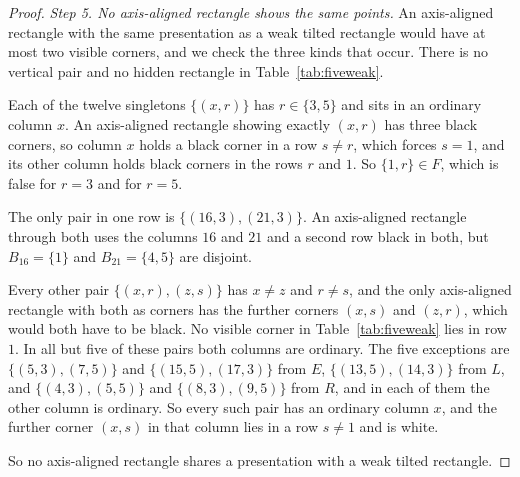\begin{proof}
\emph{Step 5. No axis-aligned rectangle shows the same points.} An axis-aligned rectangle with
the same presentation as a weak tilted rectangle would have at most two visible corners, and
we check the three kinds that occur. There is no vertical pair and no hidden rectangle in
Table~\ref{tab:fiveweak}.

Each of the twelve singletons $\{(x,r)\}$ has $r\in\{3,5\}$ and sits in an ordinary column
$x$. An axis-aligned rectangle showing exactly $(x,r)$ has three black corners, so column $x$
holds a black corner in a row $s\ne r$, which forces $s=1$, and its other column holds black
corners in the rows $r$ and $1$. So $\{1,r\}\in F$, which is false for $r=3$ and for $r=5$.

The only pair in one row is $\{(16,3),(21,3)\}$. An axis-aligned rectangle through both uses
the columns $16$ and $21$ and a second row black in both, but $B_{16}=\{1\}$ and
$B_{21}=\{4,5\}$ are disjoint.

Every other pair $\{(x,r),(z,s)\}$ has $x\ne z$ and $r\ne s$, and the only axis-aligned
rectangle with both as corners has the further corners $(x,s)$ and $(z,r)$, which would both
have to be black. No visible corner in Table~\ref{tab:fiveweak} lies in row $1$. In all
but five of these pairs both columns are ordinary. The five exceptions are
$\{(5,3),(7,5)\}$ and $\{(15,5),(17,3)\}$ from $E$, $\{(13,5),(14,3)\}$ from $L$, and
$\{(4,3),(5,5)\}$ and $\{(8,3),(9,5)\}$ from $R$, and in each of them the other column is
ordinary. So every such pair has an ordinary column $x$, and the further corner $(x,s)$ in
that column lies in a row $s\ne1$ and is white.

So no axis-aligned rectangle shares a presentation with a weak tilted rectangle.
\end{proof}

